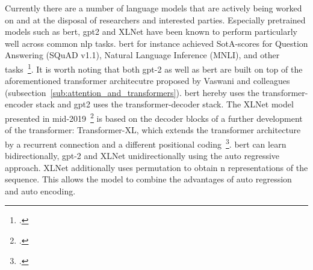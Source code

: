 Currently there are a number of language models that are actively being worked on and at the disposal of researchers and interested parties. Especially pretrained models such as \gls{bert}, \gls{gpt2} and XLNet have been known to perform particularly well across common \gls{nlp} tasks. \gls{bert} for instance achieved SotA-scores for Question Answering (SQuAD v1.1), Natural Language Inference (MNLI), and other tasks~\footcite{DBLP:journals/corr/abs-1810-04805}. It is worth noting that both \gls{gpt}-2 as well as \gls{bert} are built on top of the aforementioned transformer architecutre proposed by Vaswani and colleagues (subsection~\ref{sub:attention_and_transformers}). \gls{bert} hereby uses the transformer-encoder stack and \gls{gpt2} uses the transformer-decoder stack. The XLNet model presented in mid-2019~\footcite{DBLP:journals/corr/abs-1906-08237} is based on the decoder blocks of a further development of the transformer: Transformer-XL, which extends the transformer architecture by a recurrent connection and a different positional coding~\footcite{DBLP:journals/corr/abs-1901-02860}. \gls{bert} can learn bidirectionally, \gls{gpt}-2 and XLNet unidirectionally using the auto regressive approach. XLNet additionally uses permutation to obtain n representations of the sequence. This allows the model to combine the advantages of auto regression and auto encoding.

